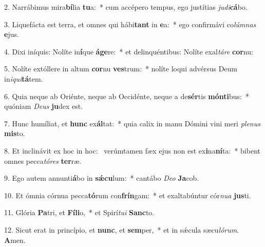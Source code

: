 2. Narrábimus mira\textbf{bí}lia \textbf{tu}a:~*  cum accépero tempus, ego justítias \textit{ju}\textit{di}\textbf{cá}bo.\

3. Liquefácta est terra, et omnes qui hábi\textbf{tant} in \textbf{e}a:~*  ego confirmávi co\textit{lúm}\textit{nas} \textbf{e}jus.\

4. Dixi iníquis: Nolíte in\textbf{í}que \textbf{á}\textbf{ge}re:~*  et delinquéntibus: Nolíte exal\textit{tá}\textit{re} \textbf{cor}nu:\

5. Nolíte extóllere in altum \textbf{cor}nu \textbf{ves}trum:~*  nolíte loqui advérsus Deum in\textit{i}\textit{qui}\textbf{tá}tem.\

6. Quia neque ab Oriénte, neque ab Occidénte, neque a de\textbf{sér}tis \textbf{món}\textbf{ti}bus:~*  quóniam \textit{De}\textit{us} \textbf{ju}dex est.\

7. Hunc humíliat, et \textbf{hunc} ex\textbf{ál}tat:~*  quia calix in manu Dómini vini meri \textit{ple}\textit{nus} \textbf{mis}to.\

8. Et inclinávit ex hoc in hoc: \dag\  verúmtamen fæx ejus non est ex\textbf{i}na\textbf{ní}ta:~*  bibent omnes pecca\textit{tó}\textit{res} \textbf{ter}ræ.\

9. Ego autem annunti\textbf{á}bo in \textbf{sǽ}\textbf{cu}lum:~*  cantábo \textit{De}\textit{o} \textbf{Ja}cob.\

10. Et ómnia córnua pecca\textbf{tó}rum con\textbf{frín}gam:~*  et exaltabúntur cór\textit{nu}\textit{a} \textbf{jus}ti.\

11. Glória \textbf{Pa}tri, et \textbf{Fí}\textbf{li}o,~*  et Spirí\textit{tu}\textit{i} \textbf{Sanc}to.\

12. Sicut erat in princípio, et \textbf{nunc}, et \textbf{sem}per,~*  et in sǽcula sæcu\textit{ló}\textit{rum}. \textbf{A}men.\


